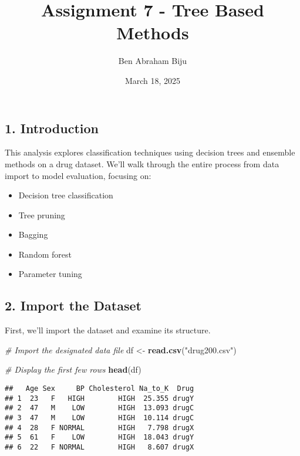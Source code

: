\documentclass[
]{article}
\title{Assignment 7 - Tree Based Methods}
\author{Ben Abraham Biju}
\date{March 18, 2025}
\newenvironment{Shaded}{\begin{snugshade}}{\end{snugshade}}
\newcommand{\CommentTok}[1]{\textcolor[rgb]{0.56,0.35,0.01}{\textit{#1}}}
\newcommand{\FunctionTok}[1]{\textcolor[rgb]{0.13,0.29,0.53}{\textbf{#1}}}
\newcommand{\NormalTok}[1]{#1}
\newcommand{\OtherTok}[1]{\textcolor[rgb]{0.56,0.35,0.01}{#1}}
\newcommand{\StringTok}[1]{\textcolor[rgb]{0.31,0.60,0.02}{#1}}
\providecommand{\tightlist}{%
  \setlength{\itemsep}{0pt}\setlength{\parskip}{0pt}}
\begin{document}
\maketitle

{
\setcounter{tocdepth}{2}
\tableofcontents
}
\subsection{1. Introduction}\label{introduction}

This analysis explores classification techniques using decision trees
and ensemble methods on a drug dataset. We'll walk through the entire
process from data import to model evaluation, focusing on:

\begin{itemize}
\tightlist
\item
  Decision tree classification
\item
  Tree pruning
\item
  Bagging
\item
  Random forest
\item
  Parameter tuning
\end{itemize}

\subsection{2. Import the Dataset}\label{import-the-dataset}

First, we'll import the dataset and examine its structure.

\begin{Shaded}
\begin{Highlighting}[]
\CommentTok{\# Import the designated data file}
\NormalTok{df }\OtherTok{\textless{}{-}} \FunctionTok{read.csv}\NormalTok{(}\StringTok{"drug200.csv"}\NormalTok{)}

\CommentTok{\# Display the first few rows}
\FunctionTok{head}\NormalTok{(df)}
\end{Highlighting}
\end{Shaded}

\begin{verbatim}
##   Age Sex     BP Cholesterol Na_to_K  Drug
## 1  23   F   HIGH        HIGH  25.355 drugY
## 2  47   M    LOW        HIGH  13.093 drugC
## 3  47   M    LOW        HIGH  10.114 drugC
## 4  28   F NORMAL        HIGH   7.798 drugX
## 5  61   F    LOW        HIGH  18.043 drugY
## 6  22   F NORMAL        HIGH   8.607 drugX
\end{verbatim}
\end{document}
